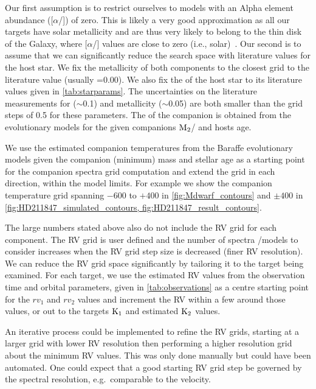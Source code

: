 Our first assumption is to restrict ourselves to models with an Alpha element abundance ([\(\alpha\)/]) of zero.
This is likely a very good approximation as all our targets have solar metallicity and are thus very likely to belong to the thin disk of the Galaxy, where [\(\alpha\)/] values are close to zero (i.e., solar)~\citet[e.g.]{adibekyan_chemical_2012}.
Our second is to assume that we can significantly reduce the search space with literature values for the host star.
We fix the metallicity of both components to the closest grid to the literature value (usually \feh{}=0.00).
We also fix the \logg{} of the host star to its literature values given in \cref{tab:starparams}.
The uncertainties on the literature measurements for \logg{} (\(\sim\)0.1) and metallicity (\(\sim\)0.05) are both smaller than the grid steps of 0.5 for these parameters.
The \logg{} of the companion is obtained from the~\citet{baraffe_evolutionary_2003,baraffe_new_2015} evolutionary models for the given companions \(\textrm{M}_{2}\)/\mtwosini{} and hosts age.

We use the estimated companion temperatures from the Baraffe evolutionary models given the companion (minimum) mass and stellar age as a starting point for the companion spectra grid computation and extend the grid in each direction, within the model limits.
For example we show the companion temperature grid spanning \(-600\) to \(+400\)\K{} in \cref{fig:Mdwarf_contours} and \(\pm400\)\K{} in \cref{fig:HD211847_simulated_contours, fig:HD211847_result_contours}.

The large numbers stated above also do not include the {RV} grid for each component.
The {RV} grid is user defined and the number of spectra /models to consider increases when the {RV} grid step size is decreased (finer {RV} resolution).
We can reduce the {RV} grid space significantly by tailoring it to the target being examined.
For each target, we use the estimated {RV} values from the observation time and orbital parameters, given in \cref{tab:observations} as a centre starting point for the \({rv}_1\) and \({rv}_2\) values and increment the {RV} within a few {\fwhm} around those values, or out to the targets \(\rm K_1\) and estimated \(\rm K_2\) values.

An iterative process could be implemented to refine the {RV} grids, starting at a larger grid with lower {RV} resolution then performing a higher resolution grid about the minimum \textchisquared{} {RV} values.
This was only done manually but could have been automated.
One could expect that a good starting {RV} grid step be governed by the spectral resolution, e.g.\ comparable to the {\fwhm} velocity.


